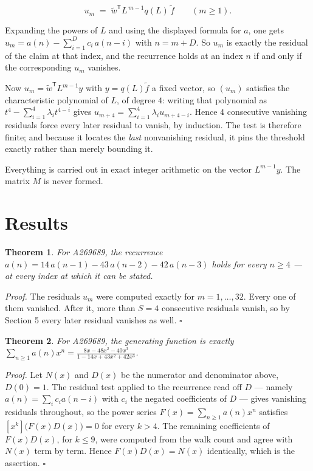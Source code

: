 \documentclass[11pt]{article}
\newtheorem{theorem}{Theorem}
\theoremstyle{definition}
\begin{document}
\[u_m \;=\; \tilde w^{\mathsf T} L^{\,m-1} q(L)\,\tilde f \qquad (m \ge 1).\]

Expanding the powers of $L$ and using the displayed formula for $a$, one gets $u_m = a(n) - \sum_{i=1}^{D} c_i\,a(n-i)$ with $n = m + D$. So $u_m$ is exactly the residual of the claim at that index, and the recurrence holds at an index $n$ if and only if the corresponding $u_m$ vanishes.

Now $u_m = \tilde w^{\mathsf T} L^{m-1} y$ with $y = q(L)\tilde f$ a fixed vector, so $(u_m)$ satisfies the characteristic polynomial of $L$, of degree $4$: writing that polynomial as $t^{4} - \sum_{i=1}^{4} \lambda_i t^{4-i}$ gives $u_{m+4} = \sum_{i=1}^{4} \lambda_i u_{m+4-i}$. Hence $4$ consecutive vanishing residuals force every later residual to vanish, by induction. The test is therefore finite; and because it locates the {\itshape last} nonvanishing residual, it pins the threshold exactly rather than merely bounding it.

Everything is carried out in exact integer arithmetic on the vector $L^{m-1}y$. The matrix $M$ is never formed.

\section{Results}

\begin{theorem} For A269689, the recurrence $a(n) = 14\,a(n-1) - 43\,a(n-2) - 42\,a(n-3)$ holds for every $n \ge 4$ --- at every index at which it can be stated.\end{theorem}

{\itshape Proof.} The residuals $u_m$ were computed exactly for $m = 1,\dots,32$. Every one of them vanished. After it, more than $S = 4$ consecutive residuals vanish, so by Section 5 every later residual vanishes as well. $\square$

\begin{theorem} For A269689, the generating function is exactly $\sum_{n\ge 1} a(n)x^n = \frac{8x - 48x^{2} - 40x^{3}}{1 - 14x + 43x^{2} + 42x^{3}}$.\end{theorem}

{\itshape Proof.} Let $N(x)$ and $D(x)$ be the numerator and denominator above, $D(0)=1$. The residual test applied to the recurrence read off $D$ --- namely $a(n) = \sum_i c_i a(n-i)$ with $c_i$ the negated coefficients of $D$ --- gives vanishing residuals throughout, so the power series $F(x)=\sum_{n\ge 1}a(n)x^n$ satisfies $[x^k]\bigl(F(x)D(x)\bigr) = 0$ for every $k > 4$. The remaining coefficients of $F(x)D(x)$, for $k \le 9$, were computed from the walk count and agree with $N(x)$ term by term. Hence $F(x)D(x) = N(x)$ identically, which is the assertion. $\square$
\end{document}
